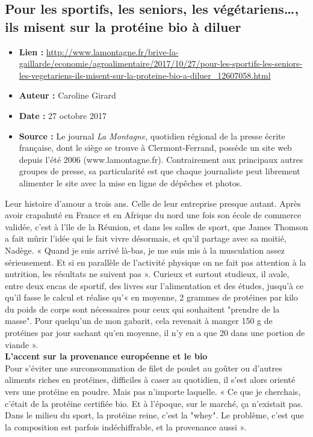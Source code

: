 \documentclass[8pt]{article}
\begin{document}
\subsection{Pour les sportifs, les seniors, les végétariens…, ils misent sur la protéine bio à diluer}
\begin{itemize}
	\item \textbf{Lien : }  \url{http://www.lamontagne.fr/brive-la-gaillarde/economie/agroalimentaire/2017/10/27/pour-les-sportifs-les-seniors-les-vegetariens-ils-misent-sur-la-proteine-bio-a-diluer_12607058.html} 
	\item \textbf{Auteur : } Caroline Girard
	\item \textbf{Date : } 27 octobre 2017
	\item \textbf{Source : } Le journal \textit{La Montagne}, quotidien régional de la presse écrite française, dont le siège se trouve à Clermont-Ferrand,  possède un site web depuis l'été 2006 (www.lamontagne.fr). Contrairement aux principaux autres groupes de presse, sa particularité est que chaque journaliste peut librement alimenter le site avec la mise en ligne de dépêches et photos.
\end{itemize}



Leur histoire d'amour a trois ans. Celle de leur entreprise presque autant. Après avoir crapahuté en France et en Afrique du nord une fois son école de commerce validée, c'est à l'île de la Réunion, et dans les salles de sport, que James Thomson a fait mûrir l'idée qui le fait vivre désormais, et qu'il partage avec sa moitié, Nadège. « Quand je suis arrivé là-bas, je me suis mis à la musculation assez sérieusement. Et si en parallèle de l'activité physique on ne fait pas attention à la nutrition, les résultats ne suivent pas ». Curieux et surtout studieux, il avale, entre deux encas de sportif, des livres sur l'alimentation et des études, jusqu'à ce qu'il fasse le calcul et réalise qu'« en moyenne, 2 grammes de protéines par kilo du poids de corps sont nécessaires pour ceux qui souhaitent "prendre de la masse". Pour quelqu'un de mon gabarit, cela revenait à manger 150 g de protéines par jour sachant qu'en moyenne, il n'y en a que 20 dans une portion de viande ».\\

\textbf{L'accent sur la provenance européenne et le bio}\\

Pour s'éviter une surconsommation de filet de poulet au goûter ou d'autres aliments riches en protéines, difficiles à caser au quotidien, il s'est alors orienté vers une protéine en poudre. Mais pas n'importe laquelle. « Ce que je cherchais, c'était de la protéine certifiée bio. Et à l'époque, sur le marché, ça n'existait pas. Dans le milieu du sport, la protéine reine, c'est la "whey". Le problème, c'est que la composition est parfois indéchiffrable, et la provenance aussi ».\\
\end{document}
